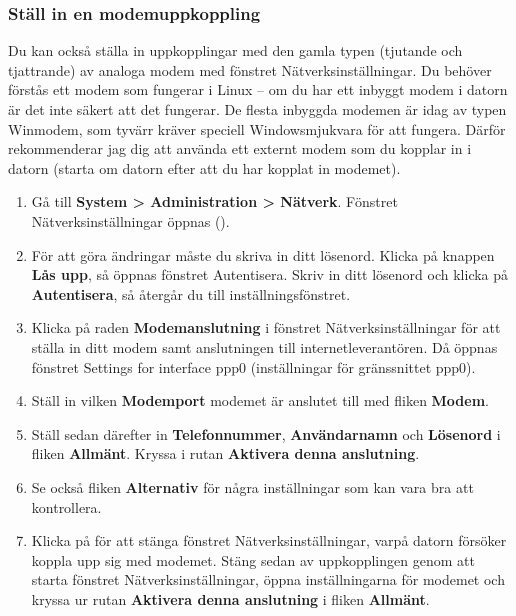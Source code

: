 \documentclass[a4paper,final]{memoir} %
\begin{document}
\subsubsection{Ställ in en modemuppkoppling}

Du kan också ställa in uppkopplingar med den gamla typen (tjutande och tjattrande) av analoga modem med fönstret Nätverksinställningar. Du behöver förstås ett modem som fungerar i Linux -- om du har ett inbyggt modem i datorn är det inte säkert att det fungerar. De flesta inbyggda modemen är idag av typen Winmodem, som tyvärr kräver speciell Windowsmjukvara för att fungera. Därför rekommenderar jag dig att använda ett externt modem som du kopplar in i datorn (starta om datorn efter att du har kopplat in modemet). 

\begin{enumerate}

\item Gå till \textbf{System \textgreater{} Administration \textgreater{} Nätverk}.  Fönstret Nätverksinställningar öppnas (). 

\item För att göra ändringar måste du skriva in ditt lösenord. Klicka på knappen \textbf{Lås upp}, så öppnas fönstret Autentisera. Skriv in ditt lösenord och klicka på \textbf{Autentisera}, så återgår du till inställningsfönstret.

\item Klicka på raden \textbf{Modemanslutning} i fönstret Nätverksinställningar för att ställa in ditt modem samt anslutningen till internetleverantören. Då öppnas fönstret Settings for interface ppp0 (inställningar för gränssnittet ppp0). 

\item Ställ in vilken \textbf{Modemport} modemet är anslutet till med fliken \textbf{Modem}.

\item Ställ sedan därefter in \textbf{Telefonnummer}, \textbf{Användarnamn} och \textbf{Lösenord} i fliken \textbf{Allmänt}. Kryssa i rutan \textbf{Aktivera denna anslutning}. 

\item Se också fliken \textbf{Alternativ} för några inställningar som kan vara bra att kontrollera. 

\item Klicka på \xstang{} för att stänga fönstret Nätverksinställningar, varpå datorn försöker koppla upp sig med modemet. Stäng sedan av uppkopplingen genom att starta fönstret Nätverksinställningar, öppna inställningarna för modemet och kryssa ur rutan \textbf{Aktivera denna anslutning} i fliken \textbf{Allmänt}. 

\end{enumerate}
\end{document}
